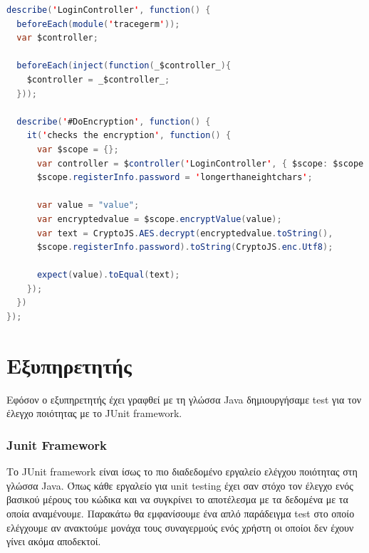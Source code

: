 \begin{lstlisting}[language=Java, caption=Jasmine test, label={lst:jasmine-test}]
describe('LoginController', function() {
  beforeEach(module('tracegerm'));
  var $controller;

  beforeEach(inject(function(_$controller_){
    $controller = _$controller_;
  }));

  describe('#DoEncryption', function() {
    it('checks the encryption', function() {
      var $scope = {};
      var controller = $controller('LoginController', { $scope: $scope });
      $scope.registerInfo.password = 'longerthaneightchars';

      var value = "value";
      var encryptedvalue = $scope.encryptValue(value);
      var text = CryptoJS.AES.decrypt(encryptedvalue.toString(), 
      $scope.registerInfo.password).toString(CryptoJS.enc.Utf8);
      
      expect(value).toEqual(text);
    });
  })
});
\end{lstlisting}

\section{Εξυπηρετητής}
Εφόσον ο εξυπηρετητής έχει γραφθεί με τη γλώσσα Java δημιουργήσαμε test για τον έλεγχο ποιότητας με το JUnit framework.

\subsubsection{Junit Framework}
Το JUnit framework είναι ίσως το πιο διαδεδομένο εργαλείο ελέγχου ποιότητας στη γλώσσα Java. Όπως κάθε εργαλείο για unit testing έχει σαν στόχο τον έλεγχο ενός βασικού μέρους του κώδικα και να συγκρίνει το αποτέλεσμα με τα δεδομένα με τα οποία αναμένουμε. Παρακάτω θα εμφανίσουμε ένα απλό παράδειγμα test στο οποίο ελέγχουμε αν ανακτούμε μονάχα τους συναγερμούς ενός χρήστη οι οποίοι δεν έχουν γίνει ακόμα αποδεκτοί.

